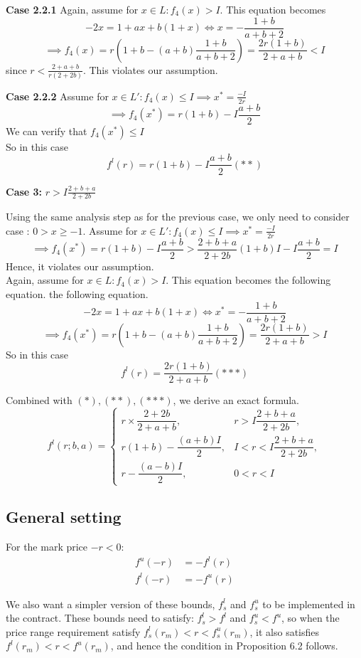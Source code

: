 \documentclass[notitlepage,reqno,11pt]{amsart}
\numberwithin{equation}{section}
\begin{document}
\textbf{Case 2.2.1} Again, assume for $x \in L : $$  f_4(x) > I $. This equation becomes \[ -2x = 1 + ax +b(1+x) \iff x = - \frac{1+b}{a+b+2}  \] \[ \implies f_4(x) =r(  1+b - (a+b) \frac{1+b}{a+b+2}) = \frac{2r(1+b)}{2+a+b}  < I  \]
since $r< \frac{2+a+b}{r(2+2b)}$. This violates our assumption. 

\textbf{Case 2.2.2 } Assume for $x \in L': f_4(x) \le I \implies x^* = \frac{-I}{2r} $\[ \implies f_4(x^*) = r(1+b) - I \frac{a+b}{2} \]
We can verify that $f_4(x^*) \le I$\\
So in this case \[ f^l(r) = r(1+b) - I \frac{a+b}{2} (**)\]

\textbf{Case 3:} $r> I \frac{2+b+a}{2+2b}$ 

Using the same analysis step as for the previous case, we only need to consider case : $ 0 >x \ge -1 $. Assume for $x \in L': f_4(x) \le I \implies x^* = \frac{-I}{2r} $\[ \implies f_4(x^*) = r(1+b) - I \frac{a+b}{2} > \frac{2+b+a}{2+2b} (1+b) I - I \frac{a+b}{2} = I\]
Hence, it violates our assumption.\\
Again, assume for $x \in L : $$  f_4(x) > I $. This equation becomes the following equation. the following equation. \[ -2x = 1 + ax +b(1+x) \iff x^* = - \frac{1+b}{a+b+2}  \] \[ \implies f_4(x^*) =r(  1+b - (a+b) \frac{1+b}{a+b+2}) = \frac{2r(1+b)}{2+a+b}  > I  \]
So in this case \[ f^l(r) = \frac{2r(1+b)}{2+a+b} (***) \]

Combined with $(*),(**),(***)$, we derive an exact formula. 
\[
f^{l}(r; b, a) =
\begin{cases}
r \times \dfrac{2+2b}{2+a+b}, & r > I \dfrac{2+b+a}{2+2b}, \\[1.2em]
r(1+b) - \dfrac{(a+b)I}{2}, & I < r < I \dfrac{2+b+a}{2+2b}, \\[1.2em]
r - \dfrac{(a-b)I}{2}, & 0 < r < I
\end{cases}
\]


\subsection{General setting}

For the mark price $-r < 0$: 
\begin{align*}
    f^u(-r) &= -f^l(r)\\
    f^l(-r) &= -f^u(r)
\end{align*}

We also want a simpler version of these bounds, $f^l_s$ and $f^u_s$ to be implemented in the contract. These bounds need to satisfy: $f^l_s > f^l$ and $f^u_s < f^u$, so when the price range requirement satisfy $f^l_s(r_m) < r < f^u_s(r_m)$, it also satisfies $f^l(r_m) < r < f^u(r_m)$, and hence the condition in Proposition 6.2 follows.
\end{document}
